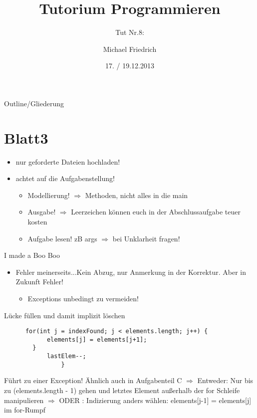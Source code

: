 \documentclass[18pt]{beamer}
\title[Prog Tut Nr. 8]{Tutorium Programmieren}
\subtitle{Tut Nr.8: }
\author{Michael Friedrich}
\date{17. / 19.12.2013}
\institute{Institut f\"ur theoretische Informatik}
\begin{document}

\begin{frame}
	\titlepage
\end{frame}

\begin{frame}{Outline/Gliederung}
	\tableofcontents
\end{frame}

\section{Blatt3}
\begin{frame}\pause
\begin{itemize}
	\item nur geforderte Dateien hochladen! \pause
	\item achtet auf die Aufgabenstellung! \pause
	\begin{itemize}
		\item Modellierung! $\Rightarrow$ Methoden, nicht alles in die main \pause
		\item Ausgabe! $\Rightarrow$ Leerzeichen können euch in der Abschlussaufgabe teuer kosten\pause
		\item Aufgabe lesen! zB args $\Rightarrow$ bei Unklarheit fragen!
	\end{itemize}
\end{itemize}
\end{frame}

\begin{frame}[fragile]{I made a Boo Boo}\pause
\begin{itemize}
	\item Fehler meinerseits...Kein Abzug, nur Anmerkung in der Korrektur. Aber in Zukunft Fehler!\pause
\begin{itemize}
	\item Exceptions unbedingt zu vermeiden!
\end{itemize}
\end{itemize}
\begin{block}{Lücke füllen und damit implizit löschen}\pause
\begin{lstlisting}
	  for(int j = indexFound; j < elements.length; j++) {
			elements[j] = elements[j+1];
		} 
			lastElem--;
				}
\end{lstlisting}
Führt zu einer Exception! Ähnlich auch in Aufgabenteil C \newline \pause
$\Rightarrow$ Entweder: Nur bis zu (elements.length - 1) gehen und letztes Element außerhalb der for Schleife manipulieren \newline \pause
$\Rightarrow$ ODER : Indizierung anders wählen: elements[j-1] = elements[j] im for-Rumpf
\end{block}
\end{frame}
\end{document}
